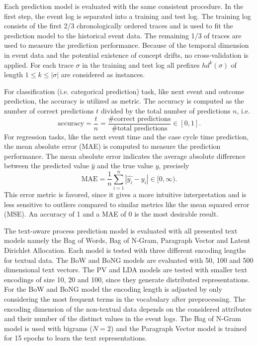 Each prediction model is evaluated with the same consistent procedure.
In the first step, the event log is separated into a training and test log. 
The training log consists of the first 2/3 chronologically ordered traces and is used to fit the prediction model to the historical event data.
The remaining 1/3 of traces are used to measure the prediction performance.
Because of the temporal dimension in event data and the potential existence of concept drifts, no cross-validation is applied.
For each trace $\sigma$ in the training and test log all prefixes $hd^k(\sigma)$ of length $1 \leq k \leq |\sigma|$ are considered as instances.

For classification (i.e. categorical prediction) task, like next event and outcome prediction, the accuracy is utilized as metric.
The accuracy is computed as the number of correct predictions $t$ divided by the total number of predictions $n$, i.e. 
\begin{equation*}
	\textrm{accuracy} = \dfrac{t}{n} = \dfrac{\textrm{\# correct predictions}}{\textrm{\# total predictions}} \in [0,1].
\end{equation*}
For regression tasks, like the next event time and the case cycle time prediction, the mean absolute error (MAE) is computed to measure the prediction performance. The mean absolute error indicates the average absolute difference between the predicted value $\hat{y}$ and the true value $y$,  precisely
\begin{equation*}
	\textrm{MAE} = \dfrac{1}{n}\sum_{i=1}^{n}|\hat{y_i} - y_i| \in [0, \infty).
\end{equation*}
This error metric is favored, since it gives a more intuitive interpretation and is less sensitive to outliers compared to similar metrics like the mean squared error (MSE).
An accuracy of 1 and a MAE of 0 is the most desirable result.

The text-aware process prediction model is evaluated with all presented text models namely the Bag of Words, Bag of N-Gram, Paragraph Vector and Latent Dirichlet Allocation.
Each model is tested with three different encoding lengths for textual data.
The BoW and BoNG models are evaluated with 50, 100 and 500 dimensional text vectors.
The PV and LDA models are tested with smaller text encodings of size 10, 20 and 100, since they generate distributed representations.
For the BoW and BoNG model the encoding length is adjusted by only considering the most frequent terms in the vocabulary after preprocessing.
The encoding dimension of the non-textual data depends on the considered attributes and their number of the distinct values in the event logs.
The Bag of N-Gram model is used with bigrams ($N = 2$) and the Paragraph Vector model is trained for 15 epochs to learn the text representations.

